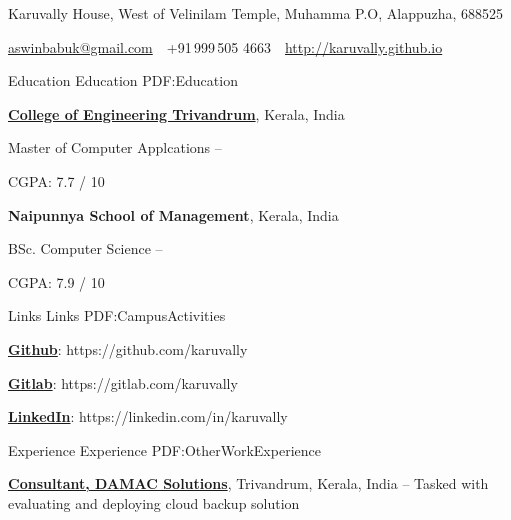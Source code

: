 \documentclass[letterpaper,MMMyyyy,nonstopmode]{simpleresumecv}
\newcommand{\CVAuthor}{Aswin Babu Karuvally}
\newcommand{\CVWebpage}{http://karuvally.github.io}
\begin{document}

\Title{\CVAuthor}

\begin{SubTitle}
Karuvally House, West of Velinilam Temple, Muhamma P.O, Alappuzha, 688525
\par
\href{mailto:aswinbabuk@gmail.com}
{aswinbabuk@gmail.com}
\,\SubBulletSymbol\,
+91\,999\,505 4663
\,\SubBulletSymbol\,
\href{\CVWebpage}
{\url{\CVWebpage}}
\end{SubTitle}

\begin{Body}


\Section
{Education}
{Education}
{PDF:Education}

\Entry
\href{http://cet.ac.in}
{\textbf{College of Engineering Trivandrum}},
Kerala, India

\Gap
\BulletItem
Master of Computer Applcations
\hfill
{} --
\begin{Detail}
\SubBulletItem
CGPA: 7.7 / 10
\end{Detail}

\BigGap
\Entry
{\textbf{Naipunnya School of Management}},
Kerala, India

\Gap
\BulletItem
BSc. Computer Science
\hfill
{} --
\begin{Detail}
\SubBulletItem
CGPA: 7.9 / 10
\end{Detail}


\BigGap
\Section
{Links}
{Links}
{PDF:CampusActivities}

\Entry
\BulletItem
\href{https://github.com/karuvally}
{\textbf{Github}}:
https://github.com/karuvally

\BigGap
\Entry
\BulletItem
\href{https://gitlab.com/karuvally}
{\textbf{Gitlab}}:
https://gitlab.com/karuvally

\BigGap
\Entry
\BulletItem
\href{https://linkedin.com/in/karuvally}
{\textbf{LinkedIn}}:
https://linkedin.com/in/karuvally


\BigGap
\Section
{Experience}
{Experience}
{PDF:OtherWorkExperience}

\Entry
\href{http://damacsolutions.com}
{\textbf{Consultant, DAMAC Solutions}},
Trivandrum, Kerala, India
\hfill
{} -- 
\Gap
\BulletItem
Tasked with evaluating and deploying cloud backup solution


\end{Body}
\end{document}
